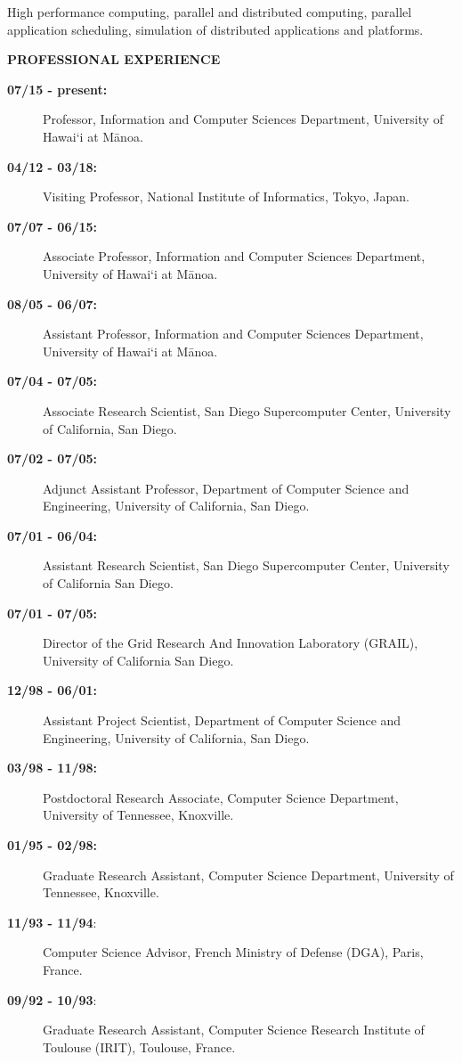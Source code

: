 \documentclass[times,11pt]{letter}
\begin{document}
High performance computing, parallel and distributed computing,
parallel application scheduling,
simulation of distributed applications and platforms.

\noindent
{\large{\bf PROFESSIONAL EXPERIENCE}}

\begin{description}
\item [{\bf 07/15 - present:}] Professor, Information and Computer Sciences Department,  University of Hawai`i at M\=anoa.
\item [{\bf 04/12 - 03/18:}] Visiting Professor, National Institute of Informatics,  Tokyo, Japan.
\item [{\bf 07/07 - 06/15:}] Associate Professor, Information and Computer Sciences Department,  University of Hawai`i at M\=anoa.
\item [{\bf 08/05 - 06/07:}] Assistant Professor, Information and Computer Sciences Department,  University of Hawai`i at M\=anoa.
\item [{\bf 07/04 - 07/05:}]  Associate Research Scientist, 
       San Diego Supercomputer Center, University of California, San Diego.
\item [{\bf 07/02 - 07/05:}]  Adjunct Assistant Professor, 
       Department of Computer Science and Engineering, University of California, San Diego.
\item [{\bf 07/01 - 06/04:}]  Assistant Research Scientist, 
       San Diego Supercomputer Center, University of California San Diego.
\item [{\bf 07/01 - 07/05:}]  Director of the Grid Research And Innovation Laboratory (GRAIL), University of California San Diego. 

\item [{\bf 12/98 - 06/01:}] Assistant Project Scientist, Department of
       Computer Science and Engineering, University of California, San Diego.
\item [{\bf 03/98 - 11/98:}] Postdoctoral Research Associate, Computer Science Department, University of Tennessee, Knoxville.
\item [{\bf 01/95 - 02/98:}] Graduate Research Assistant, Computer Science Department, University of Tennessee, Knoxville.
\item [{\bf 11/93 - 11/94}:] Computer Science Advisor, French Ministry of Defense (DGA), Paris, France.
\item [{\bf 09/92 - 10/93}:] Graduate Research Assistant, Computer Science Research Institute of Toulouse (IRIT), Toulouse, France.


\end{description}
\end{document}
